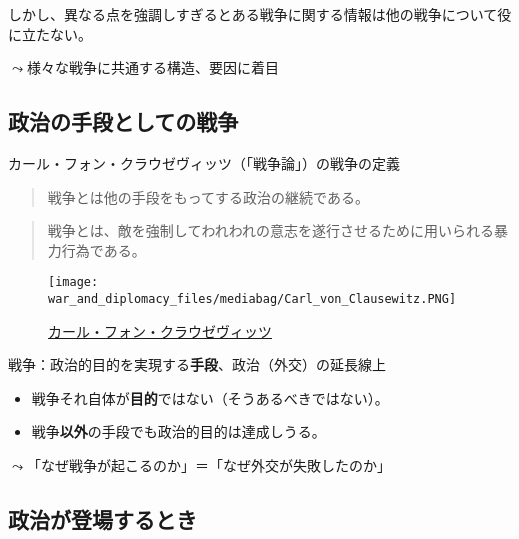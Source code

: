 \documentclass[
  xelatex,
  ja=standard]{bxjsarticle}
\providecommand{\tightlist}{%
  \setlength{\itemsep}{0pt}\setlength{\parskip}{0pt}}\usepackage{longtable,booktabs,array}
\begin{document}
しかし、異なる点を強調しすぎるとある戦争に関する情報は他の戦争について役に立たない。

\(\leadsto\)様々な戦争に共通する構造、要因に着目

\hypertarget{ux653fux6cbbux306eux624bux6bb5ux3068ux3057ux3066ux306eux6226ux4e89}{%
\subsection{政治の手段としての戦争}\label{ux653fux6cbbux306eux624bux6bb5ux3068ux3057ux3066ux306eux6226ux4e89}}

カール・フォン・クラウゼヴィッツ（「戦争論」）の戦争の定義\citep{clausewitz2020}

\begin{quote}
戦争とは他の⼿段をもってする政治の継続である。
\end{quote}

\begin{quote}
戦争とは、敵を強制してわれわれの意志を遂⾏させるために⽤いられる暴⼒⾏為である。
\end{quote}

\begin{figure}[htpb]

{\centering \texttt{[image: war\_and\_diplomacy\_files/mediabag/Carl\_von\_Clausewitz.PNG]}

}

\caption{\href{https://commons.wikimedia.org/wiki/File:Carl_von_Clausewitz.PNG}{カール・フォン・クラウゼヴィッツ}}

\end{figure}

戦争：政治的目的を実現する\textbf{手段}、政治（外交）の延長線上

\begin{itemize}
\tightlist
\item
  戦争それ自体が\textbf{目的}ではない（そうあるべきではない）。
\item
  戦争\textbf{以外}の手段でも政治的目的は達成しうる。
\end{itemize}

\(\leadsto\)「なぜ戦争が起こるのか」＝「なぜ外交が失敗したのか」\citep{fearon1995}

\hypertarget{ux653fux6cbbux304cux767bux5834ux3059ux308bux3068ux304d}{%
\subsection{政治が登場するとき}\label{ux653fux6cbbux304cux767bux5834ux3059ux308bux3068ux304d}}
\end{document}
